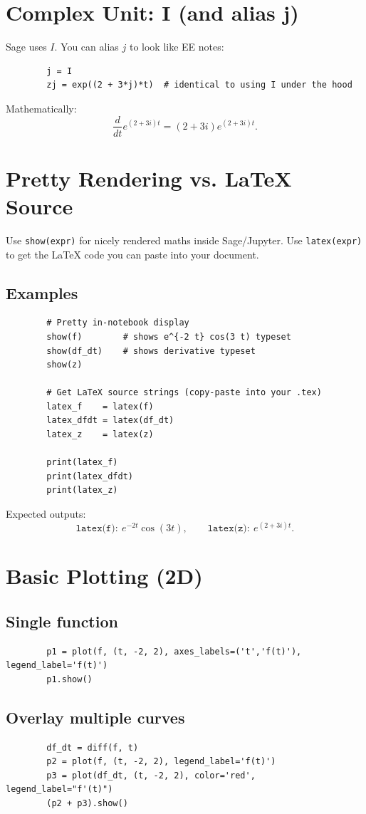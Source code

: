 \documentclass[11pt,a4paper]{article}
\begin{document}
	\section{Complex Unit: I (and alias j)}
	Sage uses $I$. You can alias $j$ to look like EE notes:
	\begin{verbatim}
		j = I
		zj = exp((2 + 3*j)*t)  # identical to using I under the hood
	\end{verbatim}
	Mathematically:
	$$
	\frac{d}{dt}e^{(2+3i)t}=(2+3i)e^{(2+3i)t}.
	$$
	
	\section{Pretty Rendering vs. LaTeX Source}
	Use \verb|show(expr)| for nicely rendered maths inside Sage/Jupyter.  
	Use \verb|latex(expr)| to get the LaTeX code you can paste into your document.
	
	\subsection*{Examples}
	\begin{verbatim}
		# Pretty in-notebook display
		show(f)        # shows e^{-2 t} cos(3 t) typeset
		show(df_dt)    # shows derivative typeset
		show(z)
		
		# Get LaTeX source strings (copy-paste into your .tex)
		latex_f    = latex(f)       
		latex_dfdt = latex(df_dt)
		latex_z    = latex(z)
		
		print(latex_f)
		print(latex_dfdt)
		print(latex_z)
	\end{verbatim}
	
	Expected outputs:
	$$
	\texttt{latex(f)}:\ e^{-2 t}\cos(3 t),\qquad
	\texttt{latex(z)}:\ e^{(2 + 3 i) t}.
	$$
	
	\section{Basic Plotting (2D)}
	\subsection*{Single function}
	\begin{verbatim}
		p1 = plot(f, (t, -2, 2), axes_labels=('t','f(t)'), legend_label='f(t)')
		p1.show()
	\end{verbatim}
	
	\subsection*{Overlay multiple curves}
	\begin{verbatim}
		df_dt = diff(f, t)
		p2 = plot(f, (t, -2, 2), legend_label='f(t)')
		p3 = plot(df_dt, (t, -2, 2), color='red', legend_label="f'(t)")
		(p2 + p3).show()
	\end{verbatim}
	
\end{document}
